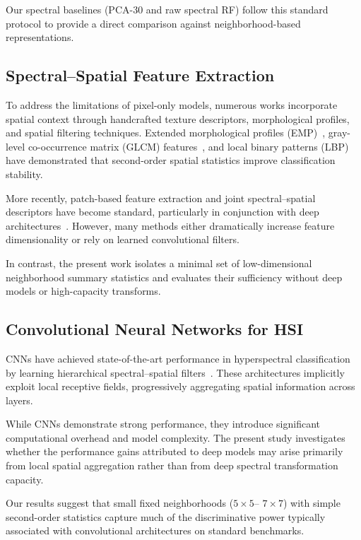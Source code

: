 \documentclass[journal]{IEEEtran}
\begin{document}
Our spectral baselines (PCA-30 and raw spectral RF) follow this
standard protocol to provide a direct comparison against
neighborhood-based representations.

\subsection{Spectral--Spatial Feature Extraction}

To address the limitations of pixel-only models, numerous works
incorporate spatial context through handcrafted texture descriptors,
morphological profiles, and spatial filtering techniques. Extended
morphological profiles (EMP)~\cite{benediktsson2005_emp}, gray-level
co-occurrence matrix (GLCM) features~\cite{haralick1973_textural}, and local
binary patterns (LBP)~\cite{ojala2002_lbp} have demonstrated that
second-order spatial statistics improve classification stability.

More recently, patch-based feature extraction and joint
spectral--spatial descriptors have become standard, particularly in
conjunction with deep architectures~\cite{chen2016_deep_hsi_cnn}. However,
many methods either dramatically increase feature dimensionality or
rely on learned convolutional filters.

In contrast, the present work isolates a minimal set of
low-dimensional neighborhood summary statistics and evaluates their
sufficiency without deep models or high-capacity transforms.

\subsection{Convolutional Neural Networks for HSI}

CNNs have achieved state-of-the-art performance in hyperspectral
classification by learning hierarchical spectral--spatial
filters~\cite{hu2015_deep_cnn_hsi,li2017_3dcnn_hsi}. These architectures
implicitly exploit local receptive fields, progressively aggregating
spatial information across layers.

While CNNs demonstrate strong performance, they introduce significant
computational overhead and model complexity. The present study
investigates whether the performance gains attributed to deep models
may arise primarily from local spatial aggregation rather than from
deep spectral transformation capacity.

Our results suggest that small fixed neighborhoods ($5{\times}5$--
$7{\times}7$) with simple second-order statistics capture much of the
discriminative power typically associated with convolutional
architectures on standard benchmarks.
\end{document}
